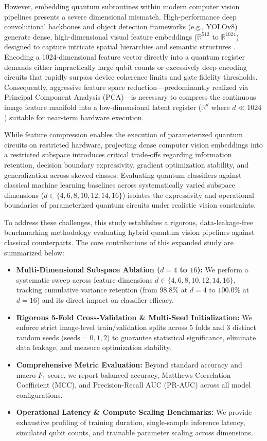 \documentclass[10pt,twocolumn,letterpaper]{article}
\begin{document}
However, embedding quantum subroutines within modern computer vision pipelines presents a severe dimensional mismatch. High-performance deep convolutional backbones and object detection frameworks (e.g., YOLOv8) generate dense, high-dimensional visual feature embeddings ($\mathbb{R}^{512}$ to $\mathbb{R}^{1024}$) designed to capture intricate spatial hierarchies and semantic structures \cite{ref2}. Encoding a 1024-dimensional feature vector directly into a quantum register demands either impractically large qubit counts or excessively deep encoding circuits that rapidly surpass device coherence limits and gate fidelity thresholds. Consequently, aggressive feature space reduction—predominantly realized via Principal Component Analysis (PCA)—is necessary to compress the continuous image feature manifold into a low-dimensional latent register ($\mathbb{R}^d$ where $d \ll 1024$) suitable for near-term hardware execution.

While feature compression enables the execution of parameterized quantum circuits on restricted hardware, projecting dense computer vision embeddings into a restricted subspace introduces critical trade-offs regarding information retention, decision boundary expressivity, gradient optimization stability, and generalization across skewed classes. Evaluating quantum classifiers against classical machine learning baselines across systematically varied subspace dimensions ($d \in \{4, 6, 8, 10, 12, 14, 16\}$) isolates the expressivity and operational boundaries of parameterized quantum circuits under realistic vision constraints.

To address these challenges, this study establishes a rigorous, data-leakage-free benchmarking methodology evaluating hybrid quantum vision pipelines against classical counterparts. The core contributions of this expanded study are summarized below:
\begin{itemize}
    \item \textbf{Multi-Dimensional Subspace Ablation ($d = 4$ to $16$):} We perform a systematic sweep across feature dimensions $d \in \{4, 6, 8, 10, 12, 14, 16\}$, tracking cumulative variance retention (from $98.8\%$ at $d=4$ to $100.0\%$ at $d=16$) and its direct impact on classifier efficacy.
    \item \textbf{Rigorous 5-Fold Cross-Validation \& Multi-Seed Initialization:} We enforce strict image-level train/validation splits across 5 folds and 3 distinct random seeds ($\text{seeds}=0, 1, 2$) to guarantee statistical significance, eliminate data leakage, and measure optimization stability.
    \item \textbf{Comprehensive Metric Evaluation:} Beyond standard accuracy and macro $F_1$-score, we report balanced accuracy, Matthews Correlation Coefficient (MCC), and Precision-Recall AUC (PR-AUC) across all model configurations.
    \item \textbf{Operational Latency \& Compute Scaling Benchmarks:} We provide exhaustive profiling of training duration, single-sample inference latency, simulated qubit counts, and trainable parameter scaling across dimensions.
\end{itemize}
\end{document}
